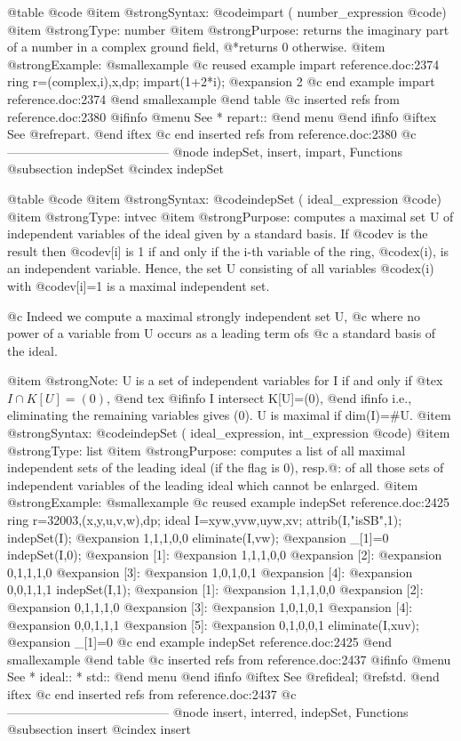 {@table @code
@item @strong{Syntax:}
@code{impart (} number_expression @code{)}
@item @strong{Type:}
number
@item @strong{Purpose:}
returns the imaginary part of a number in a complex ground field,
@*returns 0 otherwise.
@item @strong{Example:}
@smallexample
@c reused example impart reference.doc:2374 
  ring r=(complex,i),x,dp;
  impart(1+2*i);
@expansion{} 2
@c end example impart reference.doc:2374
@end smallexample
@end table
@c inserted refs from reference.doc:2380
@ifinfo
@menu
See
* repart::
@end menu
@end ifinfo
@iftex
See
@ref{repart}.
@end iftex
@c end inserted refs from reference.doc:2380
@c ---------------------------------------
@node indepSet, insert, impart, Functions
@subsection indepSet
@cindex indepSet

@table @code
@item @strong{Syntax:}
@code{indepSet (} ideal_expression @code{)}
@item @strong{Type:}
intvec
@item @strong{Purpose:}
computes a maximal set U of independent variables of the ideal given by
a standard basis.  If @code{v} is the result then @code{v[i]} is 1 if and
only if the i-th variable of the ring, @code{x(i)}, is an independent
variable.  Hence, the set U consisting of all variables @code{x(i)} with
@code{v[i]=1} is a maximal independent set.

@c Indeed we compute a maximal strongly independent set U,
@c where no power of a variable from U occurs as a leading term ofs
@c a standard basis of the ideal.

@item @strong{Note:}
U is a set of independent variables for I if and only if
@tex
$I \cap K[U]=(0)$,
@end tex
@ifinfo
I intersect K[U]=(0),
@end ifinfo
i.e., eliminating the remaining variables gives (0).
U is maximal if dim(I)=#U.
@item @strong{Syntax:}
@code{indepSet (} ideal_expression, int_expression @code{)}
@item @strong{Type:}
list
@item @strong{Purpose:}
computes a list of all maximal independent sets of the leading ideal
(if the flag is 0), resp.@: of all those sets of independent variables
of the leading ideal which cannot be enlarged.
@item @strong{Example:}
@smallexample
@c reused example indepSet reference.doc:2425 
  ring r=32003,(x,y,u,v,w),dp;
  ideal I=xyw,yvw,uyw,xv;
  attrib(I,"isSB",1);
  indepSet(I);
@expansion{} 1,1,1,0,0
  eliminate(I,vw);
@expansion{} _[1]=0
  indepSet(I,0);
@expansion{} [1]:
@expansion{}    1,1,1,0,0
@expansion{} [2]:
@expansion{}    0,1,1,1,0
@expansion{} [3]:
@expansion{}    1,0,1,0,1
@expansion{} [4]:
@expansion{}    0,0,1,1,1
  indepSet(I,1);
@expansion{} [1]:
@expansion{}    1,1,1,0,0
@expansion{} [2]:
@expansion{}    0,1,1,1,0
@expansion{} [3]:
@expansion{}    1,0,1,0,1
@expansion{} [4]:
@expansion{}    0,0,1,1,1
@expansion{} [5]:
@expansion{}    0,1,0,0,1
  eliminate(I,xuv);
@expansion{} _[1]=0
@c end example indepSet reference.doc:2425
@end smallexample
@end table
@c inserted refs from reference.doc:2437
@ifinfo
@menu
See
* ideal::
* std::
@end menu
@end ifinfo
@iftex
See
@ref{ideal};
@ref{std}.
@end iftex
@c end inserted refs from reference.doc:2437
@c ---------------------------------------
@node insert, interred, indepSet, Functions
@subsection insert
@cindex insert

}
